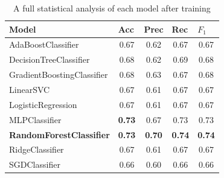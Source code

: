 \documentclass[12pt,a4paper]{article}
\begin{document}
\begin{table}[htb]
\centering
\caption{A full statistical analysis of each model after training}
\label{table:results_explore}
\begin{tabular}{|p{5cm}|c|c|c|c|}
\hline
\textbf{Model}                  & \multicolumn{1}{l|}{\textbf{Acc}} & \multicolumn{1}{l|}{\textbf{Prec}} & \multicolumn{1}{l|}{\textbf{Rec}} & \multicolumn{1}{l|}{\textbf{$F_1$}} \\ \hline
AdaBoostClassifier              & 0.67                              & 0.62                               & 0.67                              & 0.67                               \\ \hline
DecisionTreeClassifier          & 0.68                              & 0.62                               & 0.69                              & 0.68                               \\ \hline
GradientBoostingClassifier      & 0.68                              & 0.63                               & 0.67                              & 0.68                               \\ \hline
LinearSVC                       & 0.67                              & 0.61                               & 0.67                              & 0.67                               \\ \hline
LogisticRegression              & 0.67                              & 0.61                               & 0.67                              & 0.67                               \\ \hline
MLPClassifier                   &\textbf{0.73}                              & 0.67                               & 0.73                              & 0.73                               \\ \hline
\textbf{RandomForestClassifier} & \textbf{0.73}                     & \textbf{0.70}                      & \textbf{0.74}                     & \textbf{0.74}                      \\ \hline
RidgeClassifier                 & 0.67                              & 0.61                               & 0.67                              & 0.67                               \\ \hline
SGDClassifier                   & 0.66                              & 0.60                               & 0.66                              & 0.66                               \\ \hline
\end{tabular}
\end{table}
\end{document}
